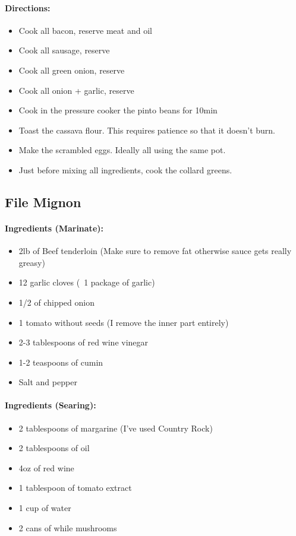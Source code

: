 \documentclass{article}
\begin{document}
\paragraph{Directions:}
\begin{itemize}
    \item Cook all bacon, reserve meat and oil
    \item Cook all sausage, reserve
    \item Cook all green onion, reserve
    \item Cook all onion + garlic, reserve
    \item Cook in the pressure cooker the pinto beans for 10min
    \item Toast the cassava flour. This requires patience so that it doesn't burn.
    \item Make the scrambled eggs. Ideally all using the same pot.
    \item Just before mixing all ingredients, cook the collard greens.
\end{itemize}

\subsection{File Mignon} 

\paragraph{Ingredients (Marinate):}
\begin{itemize}
    \item 2lb of Beef tenderloin (Make sure to remove fat otherwise sauce gets really greasy)
    \item 12 garlic cloves (~1 package of garlic)
    \item 1/2 of chipped onion
    \item 1 tomato without seeds (I remove the inner part entirely)
    \item 2-3 tablespoons of red wine vinegar
    \item 1-2 teaspoons of cumin
    \item Salt and pepper
\end{itemize}  

\paragraph{Ingredients (Searing):}
\begin{itemize}
    \item 2 tablespoons of margarine (I've used Country Rock)
    \item 2 tablespoons of oil
    \item 4oz of red wine
    \item 1 tablespoon of tomato extract
    \item 1 cup of water
    \item 2 cans of while mushrooms
\end{itemize}  
\end{document}

